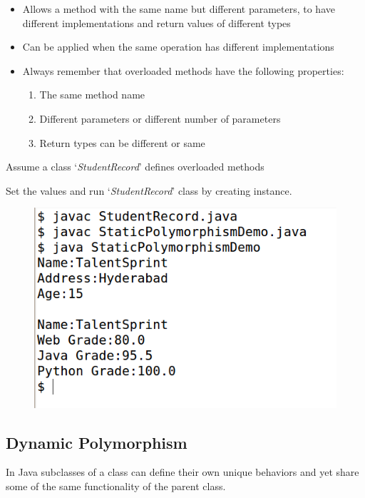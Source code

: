 \documentclass[11pt,a4paper]{article}
\begin{document}
 \begin{itemize}
  \item Allows a method with the same name but different parameters, to have different implementations and return values of different types
  \item Can be applied when the same operation has different implementations
  \item Always remember that overloaded methods have the following properties:
  \begin{enumerate}
   \item The same method name
   \item Different parameters or different number of parameters
   \item Return types can be different or same
  \end{enumerate}

 \end{itemize}
 Assume a class `\emph{StudentRecord}' defines overloaded methods
  
  
  Set the values and run `\emph{StudentRecord}' class by creating instance.
  
  
 \begin{figure}[H] 
 \begin{center}
   \includegraphics[scale=.5]{StaticPolymorphismDemo.png}
 \end{center}
 \end{figure}

 \subsection*{Dynamic Polymorphism} 
 In Java subclasses of a class can define their own unique behaviors and yet share some of the same functionality of the parent class.
 
\end{document}
